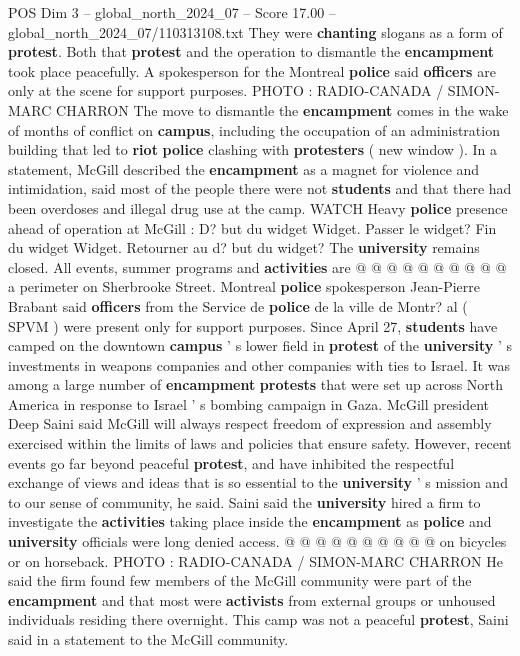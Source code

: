 \begin{textsample}{POS Dim 3 – global\_north\_2024\_07 – Score 17.00 – global\_north\_2024\_07/110313108.txt}
They were \textbf{chanting} slogans as a form of \textbf{protest}.
Both that \textbf{protest} and the operation to dismantle the \textbf{encampment} took place peacefully.
A spokesperson for the Montreal \textbf{police} said \textbf{officers} are only at the scene for support purposes.
PHOTO : RADIO-CANADA / SIMON-MARC CHARRON The move to dismantle the \textbf{encampment} comes in the wake of months of conflict on \textbf{campus}, including the occupation of an administration building that led to \textbf{riot} \textbf{police} clashing with \textbf{protesters} ( new window ).
In a statement, McGill described the \textbf{encampment} as a magnet for violence and intimidation, said most of the people there were not \textbf{students} and that there had been overdoses and illegal drug use at the camp.
WATCH Heavy \textbf{police} presence ahead of operation at McGill : D? but du widget Widget.
Passer le widget?
Fin du widget Widget.
Retourner au d? but du widget?
The \textbf{university} remains closed.
All events, summer programs and \textbf{activities} are @ @ @ @ @ @ @ @ @ @ a perimeter on Sherbrooke Street.
Montreal \textbf{police} spokesperson Jean-Pierre Brabant said \textbf{officers} from the Service de \textbf{police} de la ville de Montr? al ( SPVM ) were present only for support purposes.
Since April 27, \textbf{students} have camped on the downtown \textbf{campus} ' s lower field in \textbf{protest} of the \textbf{university} ' s investments in weapons companies and other companies with ties to Israel.
It was among a large number of \textbf{encampment} \textbf{protests} that were set up across North America in response to Israel ' s bombing campaign in Gaza.
McGill president Deep Saini said McGill will always respect freedom of expression and assembly exercised within the limits of laws and policies that ensure safety.
However, recent events go far beyond peaceful \textbf{protest}, and have inhibited the respectful exchange of views and ideas that is so essential to the \textbf{university} ' s mission and to our sense of community, he said.
Saini said the \textbf{university} hired a firm to investigate the \textbf{activities} taking place inside the \textbf{encampment} as \textbf{police} and \textbf{university} officials were long denied access. @ @ @ @ @ @ @ @ @ @ on bicycles or on horseback.
PHOTO : RADIO-CANADA / SIMON-MARC CHARRON He said the firm found few members of the McGill community were part of the \textbf{encampment} and that most were \textbf{activists} from external groups or unhoused individuals residing there overnight.
This camp was not a peaceful \textbf{protest}, Saini said in a statement to the McGill community.

\end{textsample}
